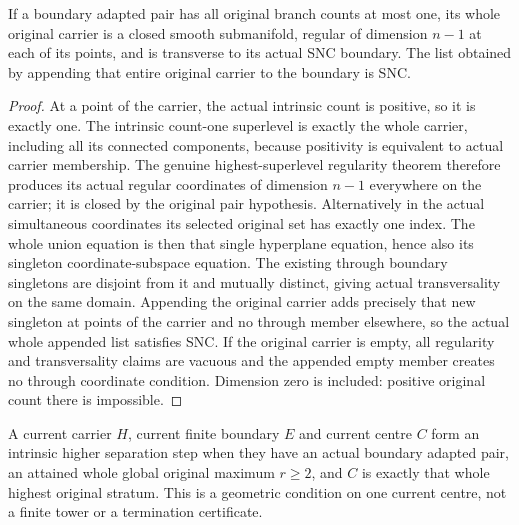 \begin{lemma}
\label{hir:general-nc-count-one-smooth-terminal-pair}
\leanok
{}
If a boundary adapted pair has all original branch counts at most one,
its whole original carrier is a closed smooth submanifold, regular
of dimension $n-1$ at each of its points, and is transverse to its
actual SNC boundary. The list obtained by appending that entire
original carrier to the boundary is SNC.
\end{lemma}
\begin{proof}
At a point of the carrier, the actual intrinsic count is positive,
so it is exactly one. The intrinsic count-one superlevel is exactly
the whole carrier, including all its connected components, because
positivity is equivalent to actual carrier membership. The genuine
highest-superlevel regularity theorem therefore produces its actual
regular coordinates of dimension $n-1$ everywhere on the carrier;
it is closed by the original pair hypothesis. Alternatively in the
actual simultaneous coordinates its selected original set has exactly
one index. The whole union equation is then that single hyperplane
equation, hence also its singleton coordinate-subspace equation.
The existing through boundary singletons are disjoint from it and
mutually distinct, giving actual transversality on the same domain.
Appending the original carrier adds precisely that new singleton at
points of the carrier and no through member elsewhere, so the actual
whole appended list satisfies SNC. If the original carrier is empty,
all regularity and transversality claims are vacuous and the appended
empty member creates no through coordinate condition. Dimension zero
is included: positive original count there is impossible.
\end{proof}

\begin{definition}
\label{hir:general-nc-intrinsic-higher-separation-step}
\leanok
{}
A current carrier $H$, current finite boundary $E$ and current centre
$C$ form an intrinsic higher separation step when they have an actual
boundary adapted pair, an attained whole global original maximum
$r\ge2$, and $C$ is exactly that whole highest original stratum.
This is a geometric condition on one current centre, not a finite
tower or a termination certificate.
\end{definition}


